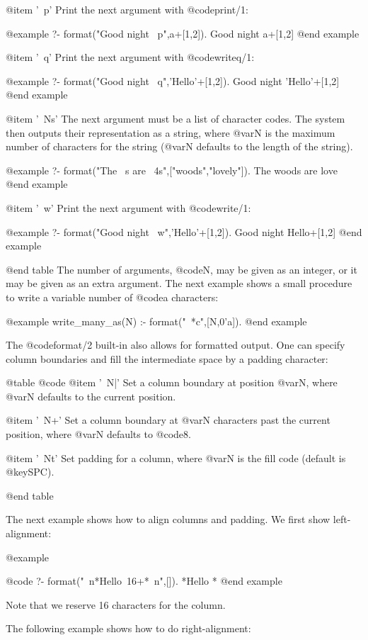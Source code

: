 {{{{{{@item '~p'
Print the next argument with @code{print/1}:

@example
?- format("Good night ~p",a+[1,2]).
Good night a+[1,2]
@end example

@item '~q'
Print the next argument with @code{writeq/1}:

@example
?- format("Good night ~q",'Hello'+[1,2]).
Good night 'Hello'+[1,2]
@end example

@item '~Ns'
The next argument must be a list of character codes. The system then
outputs their representation as a string, where @var{N} is the maximum
number of characters for the string (@var{N} defaults to the length of the
string).

@example
?- format("The ~s are ~4s",["woods","lovely"]).
The woods are love
@end example

@item '~w'
Print the next argument with @code{write/1}:

@example
?- format("Good night ~w",'Hello'+[1,2]).
Good night Hello+[1,2]
@end example

@end table
The number of arguments, @code{N}, may be given as an integer, or it
may be given as an extra argument. The next example shows a small
procedure to write a variable number of @code{a} characters:

@example
write_many_as(N) :-
        format("~*c",[N,0'a]).
@end example

The @code{format/2} built-in also allows for formatted output.  One can
specify column boundaries and fill the intermediate space by a padding
character: 

@table @code
@item '~N|'
Set a column boundary at position @var{N}, where @var{N} defaults to the
current position.

@item '~N+'
Set a column boundary at @var{N} characters past the current position, where
@var{N} defaults to @code{8}.


@item '~Nt'
Set padding for a column, where @var{N} is the fill code (default is
@key{SPC}).

@end table

The next example shows how to align columns and padding. We first show
left-alignment:

@example

@code{
   ?- format("~n*Hello~16+*~n",[]).
*Hello          *
}
@end example

Note that we reserve 16 characters for the column.

The following example shows how to do right-alignment:


}}}}}}
